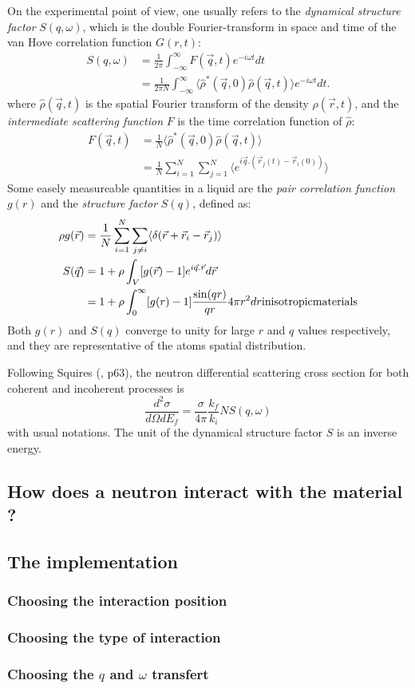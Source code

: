 On the experimental point of view, one usually refers to the \emph{dynamical structure factor} $S(q,\omega)$, which is the double Fourier-transform in space and time of the van Hove correlation function $G(r,t)$:
\begin{eqnarray} \label{eq:sqw-rho}
S(q,\omega) &= \frac{1}{2\pi}\int_{-\infty}^{\infty} F(\vec{q},t) e^{-i\omega t} dt \nonumber \\
            &= \frac{1}{2\pi N} \int_{-\infty}^{\infty} \langle \hat\rho^*(\vec{q},0) \hat\rho(\vec{q},t) \rangle e^{-i\omega t} dt.
\end{eqnarray}
where $\hat\rho(\vec{q}, t)$ is the spatial Fourier transform of the density $\rho(\vec{r},t)$, and the \emph{intermediate scattering function} $F$ is the time correlation function of $\hat\rho$:
\begin{eqnarray}
F(\vec{q},t) &= \frac{1}{N} \langle \hat\rho^*(\vec{q},0)  \hat\rho(\vec{q},t) \rangle \nonumber \\
                    &= \frac{1}{N} \sum_{i=1}^N \sum_{j=1}^N \langle e^{i \vec{q}.(\vec{r}_j(t) - \vec{r}_i(0))} \rangle
\end{eqnarray}
Some easely measureable quantities in a liquid are the \emph{pair correlation function} $g(r)$ and the \emph{structure factor} $S(q)$, defined as:
\begin{eqnarray}
\rho g(\vec{r}) &= \frac{1}{N} \sum_{i=1}^N \sum_{j \neq i} \langle \delta(\vec{r}+\vec{r}_i-\vec{r}_j) \rangle \\
S(\vec{q}) &=1 + \rho \int_V [g(\vec{r})-1] e^{i\vec{q}.\vec{r}} d\vec{r} \\
           &=1 + \rho \int_{0}^{\infty} [g(r)-1] \frac{\sin(qr)}{qr} 4 \pi r^2 dr {\rm in isotropic materials}
\end{eqnarray}
Both $g(r)$ and $S(q)$ converge to unity for large $r$ and $q$ values respectively, and they are representative of the atoms spatial distribution.


Following Squires (\cite{squires}, p63), the neutron differential scattering cross section for both coherent and incoherent processes is
\begin{equation}
\frac{d^2\sigma}{d\Omega dE_f} = \frac{\sigma}{4\pi}\frac{k_f}{k_i} N S(q, \omega)
\end{equation}
with usual notations. The unit of the dynamical structure factor $S$ is an inverse energy.

\subsection{How does a neutron interact with the material ?}


\subsection{The implementation}
\subsubsection{Choosing the interaction position}
\subsubsection{Choosing the type of interaction}
\subsubsection{Choosing the $q$ and $\omega$ transfert}